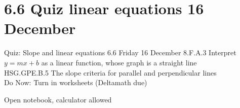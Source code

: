 \section{6.6 Quiz linear equations \hfill 16 December \,}
\begin{frame}{Quiz: Slope and linear equations \hfill \alert{6.6 Friday 16 December}}
  8.F.A.3 Interpret $y=mx+b$ as a linear function, whose graph is a straight line \\
  HSG.GPE.B.5 The slope criteria for parallel and perpendicular lines \\ \vspace{1cm}
  Do Now: Turn in worksheets (Deltamath due) \vspace{0.5cm}
  \begin{block}{Open notebook, calculator allowed}
  \end{block} \vspace{2cm}
\end{frame}

